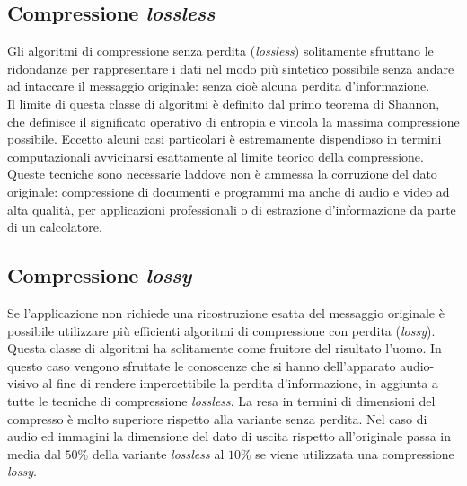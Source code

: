 \subsection{Compressione \emph{lossless}}

Gli algoritmi di compressione senza perdita (\emph{lossless}) solitamente 
sfruttano le ridondanze per rappresentare i dati nel modo più sintetico 
possibile senza andare ad intaccare il messaggio originale: senza cioè alcuna 
perdita d'informazione.\\

Il limite di questa classe di algoritmi è definito dal primo teorema di 
Shannon, che definisce il significato operativo di entropia e vincola la 
massima compressione possibile.
Eccetto alcuni casi particolari è estremamente dispendioso in termini 
computazionali avvicinarsi esattamente al limite teorico della compressione.\\

Queste tecniche sono necessarie laddove non è ammessa la corruzione del dato 
originale: compressione di documenti e programmi ma anche di audio e video ad 
alta qualità, per applicazioni professionali o di estrazione d'informazione da 
parte di un calcolatore.


\subsection{Compressione \emph{lossy}}

Se l'applicazione non richiede una ricostruzione esatta del messaggio originale 
è possibile utilizzare più efficienti algoritmi di compressione con perdita 
(\emph{lossy}).
Questa classe di algoritmi ha solitamente come fruitore del risultato l'uomo. 
In questo caso vengono sfruttate le conoscenze che si hanno dell'apparato 
audio-visivo al fine di rendere impercettibile la perdita d'informazione, in 
aggiunta a tutte le tecniche di compressione \emph{lossless}.
La resa in termini di dimensioni del compresso è molto superiore rispetto alla 
variante senza perdita. Nel caso di audio ed immagini la dimensione del dato di 
uscita rispetto all'originale passa in media dal $50\%$ della variante 
\emph{lossless} al $10\%$ se viene utilizzata una compressione \emph{lossy}.


